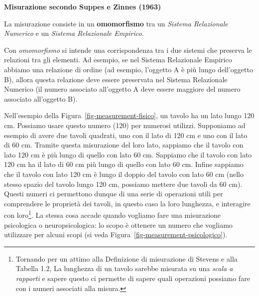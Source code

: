 \documentclass[
  italian,
  letterpaper,
  paper=6in:9in,
  pagesize=pdftex,
  headinclude=on,
  footinclude=on,
  11pt]{scrbook}
\begin{document}
\begin{tcolorbox}[enhanced jigsaw, title=\textcolor{quarto-callout-note-color}{\faInfo}\hspace{0.5em}{Definizione}, coltitle=black, bottomtitle=1mm, colback=white, bottomrule=.15mm, rightrule=.15mm, breakable, toptitle=1mm, left=2mm, colbacktitle=quarto-callout-note-color!10!white, titlerule=0mm, colframe=quarto-callout-note-color-frame, leftrule=.75mm, opacitybacktitle=0.6, arc=.35mm, toprule=.15mm, opacityback=0]

\textbf{Misurazione secondo Suppes e Zinnes (1963)}

La misurazione consiste in un \textbf{omomorfismo} tra un \emph{Sistema
Relazionale Numerico} e un \emph{Sistema Relazionale Empirico}.

\end{tcolorbox}

Con \emph{omomorfismo} si intende una corrispondenza tra i due sistemi
che preserva le relazioni tra gli elementi. Ad esempio, se nel Sistema
Relazionale Empirico abbiamo una relazione di ordine (ad esempio,
l'oggetto A è più lungo dell'oggetto B), allora questa relazione deve
essere preservata nel Sistema Relazionale Numerico (il numero associato
all'oggetto A deve essere maggiore del numero associato all'oggetto B).

Nell'esempio della Figura~\ref{fig-measurement-fisico}, un tavolo ha un
lato lungo 120 cm. Possiamo usare questo numero (120) per numerosi
utilizzi. Supponiamo ad esempio di avere due tavoli quadrati, uno con il
lato di 120 cm e uno con il lato di 60 cm. Tramite questa misurazione
del loro lato, sappiamo che il tavolo con lato 120 cm è più lungo di
quello con lato 60 cm. Sappiamo che il tavolo con lato 120 cm ha il lato
di 60 cm più lungo di quello con lato 60 cm. Infine sappiamo che il
tavolo con lato 120 cm è lungo il doppio del tavolo con lato 60 cm
(nello stesso spazio del tavolo lungo 120 cm, possiamo mettere due
tavoli da 60 cm). Questi numeri ci permettono dunque di una serie di
operazioni utili per comprendere le proprietà dei tavoli, in questo caso
la loro lunghezza, e interagire con loro\footnote{Tornando per un attimo
  alla Definizione di misurazione di Stevens e alla Tabella 1.2, La
  lunghezza di un tavolo sarebbe misurata su una \emph{scala a rapporti}
  e sapere questo ci permette di sapere quali operazioni possiamo fare
  con i numeri associati alla misura.}. La stessa cosa accade quando
vogliamo fare una misurazione psicologica o neuropsicologica: lo scopo è
ottenere un numero che vogliamo utilizzare per alcuni scopi (si veda
Figura~\ref{fig-measurement-psicologico}).
\end{document}

